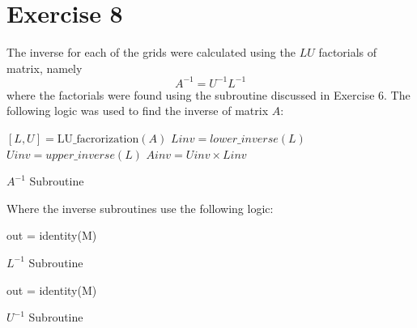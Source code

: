 \section{Exercise 8}
The inverse for each of the grids were calculated using the $LU$ factorials
of matrix, namely
\begin{equation}
    A^{-1} = U^{-1}L^{-1}
\end{equation}
where the factorials were found using the subroutine discussed in Exercise
6. The following logic was used to find the inverse of matrix $A$: 

\begin{algorithm}[H]
\DontPrintSemicolon
\SetAlgoLined
{}
\BlankLine
    $[L, U] = \text{LU\_facrorization}(A)$
\BlankLine
    $Linv   = lower\_inverse(L)$\;
    $Uinv   = upper\_inverse(L)$\;
    $Ainv   = Uinv \times Linv $\; 

    \caption{$A^{-1}$ Subroutine}
\end{algorithm}

Where the inverse subroutines use the following logic: \\ 
\begin{algorithm}[H]
\DontPrintSemicolon
\SetAlgoLined
{}

\BlankLine
    out = identity(M) \;
    \caption{$L^{-1}$ Subroutine}
\end{algorithm}
\begin{algorithm}[H]
\DontPrintSemicolon
\SetAlgoLined
{}

\BlankLine
    out = identity(M) \;
    \caption{$U^{-1}$ Subroutine}
\end{algorithm}

